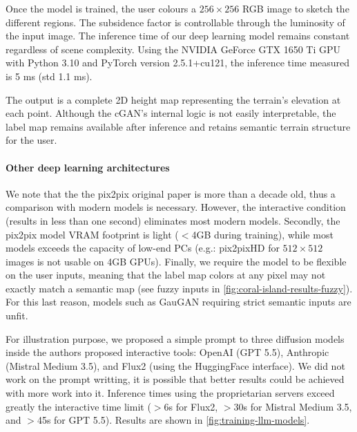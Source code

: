 Once the model is trained, the user colours a $256\times256$ RGB image to sketch the different regions. The subsidence factor is controllable through the luminosity of the input image. The inference time of our deep learning model remains constant regardless of scene complexity. Using the NVIDIA GeForce GTX 1650 Ti GPU with Python 3.10 and PyTorch version 2.5.1+cu121, the inference time measured is 5 ms (std 1.1 ms).

The output is a complete 2D height map representing the terrain's elevation at each point. Although the cGAN's internal logic is not easily interpretable, the label map remains available after inference and retains semantic terrain structure for the user.



\paragraph{Other deep learning architectures}
We note that the the pix2pix original paper is more than a decade old, thus a comparison with modern models is necessary. However, the interactive condition (results in less than one second) eliminates most modern models. Secondly, the pix2pix model VRAM footprint is light ($<$4GB during training), while most models exceeds the capacity of low-end PCs (e.g.: pix2pixHD for $512\times512$ images is not usable on 4GB GPUs). Finally, we require the model to be flexible on the user inputs, meaning that the label map colors at any pixel may not exactly match a semantic map (see fuzzy inputs in \cref{fig:coral-island-results-fuzzy}). For this last reason, models such as GauGAN requiring strict semantic inputs are unfit.

For illustration purpose, we proposed a simple prompt to three diffusion models inside the authors proposed interactive tools: OpenAI (GPT 5.5), Anthropic (Mistral Medium 3.5), and Flux2 (using the HuggingFace interface). We did not work on the prompt writting, it is possible that better results could be achieved with more work into it. Inference times using the proprietarian servers exceed greatly the interactive time limit ($>$6s for Flux2, $>$30s for Mistral Medium 3.5, and $>$45s for GPT 5.5). Results are shown in \cref{fig:training-llm-models}. 

